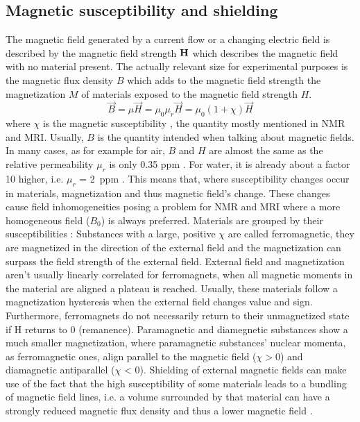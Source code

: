             \subsection{Magnetic susceptibility and shielding}
                The magnetic field generated by a current flow or a changing electric field is described by the magnetic field strength $\mathbf{H}$ which describes the magnetic field with no material present. The actually relevant size for experimental purposes is the magnetic flux density $B$ which adds to the magnetic field strength the magnetization $M$ of materials exposed to the magnetic field strength $H$.
                \begin{equation}
                    \vec{B} = \mu \vec{H} = \mu_0 \mu_r \vec{H} = \mu_0(1+\chi) \vec{H}
                \end{equation}
                where $\chi$ is the magnetic susceptibility \cite{schenck_role_1996}, the quantity mostly mentioned in NMR and MRI. Usually, $B$ is the quantity intended when talking about magnetic fields.
                In many cases, as for example for air, $B$ and $H$ are almost the same as the relative permeability \cite{kriz_magnetic_1996} $\mu_r$ is only 0.35 ppm \cite{cullity_introduction_2008}. For water, it is already about a factor 10 higher, i.e. $\mu_r$ = 2~ppm . 
                This means that, where susceptibility changes occur in materials, magnetization and thus magnetic field's change. These changes cause field inhomogeneities posing a problem for NMR and MRI where a more homogeneous field ($B_0$) is always preferred. Materials are grouped by their susceptibilities \cite{b.i._bleaney__b._bleaney_electricity_nodate}:
                Substances with a large, positive $\chi$ are called ferromagnetic, they are magnetized in the direction of the external field and the magnetization can surpass the field strength of the external field. External field and magnetization aren't usually linearly correlated for ferromagnets, when all magnetic moments in the material are aligned a plateau is reached. Usually, these materials follow a magnetization hysteresis when the external field changes value and sign. Furthermore, ferromagnets do not necessarily return to their unmagnetized state if H returns to 0 (remanence).
                Paramagnetic and diamegnetic substances show a much smaller magnetization, where paramagnetic substances' nuclear momenta, as ferromagnetic ones, align parallel to the magnetic field ($\chi>0$) and diamagnetic antiparallel ($\chi$ < 0).
                Shielding of external magnetic fields can make use of the fact that the high susceptibility of some materials leads to a bundling of magnetic field lines, i.e. a volume surrounded by that material can have a strongly reduced magnetic flux density and thus a lower magnetic field \cite{mager_magnetic_1970}.
